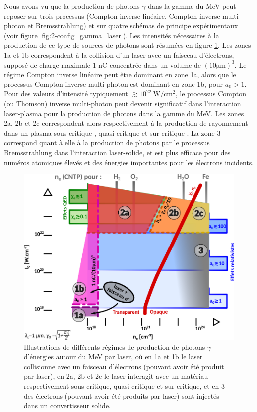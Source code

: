 \begin{refsection}
Nous avons vu que la production de photons $\gamma$ dans la gamme du MeV peut reposer sur trois processus (Compton inverse linéaire, Compton inverse multi-photon et Bremsstrahlung) et sur quatre schémas de principe expérimentaux (voir figure \ref{fig:2-config_gamma_laser}). Les intensités nécessaires à la production de ce type de sources de photons sont résumées en figure \ref{fig:2-regimes_gamma}. Les zones 1a et 1b correspondent à la collision d'un laser avec un faisceau d'électrons, supposé de charge maximale 1 nC concentrée dans un volume de $(10 \si{\um})^3$. Le régime Compton inverse linéaire peut être dominant en zone 1a, alors que le processus Compton inverse multi-photon est dominant en zone 1b, pour $a_0>1$. Pour des valeurs d'intensité typiquement $\gtrsim 10^{22} ~ \si{\W\per\cm^2}$, le processus Compton (ou Thomson) inverse multi-photon peut devenir significatif dans l'interaction laser-plasma pour la production de photons dans la gamme du MeV. Les zones 2a, 2b et 2c correspondent alors respectivement à la production de rayonnement dans un plasma sous-critique \parencite{brady_2012}, quasi-critique \parencite{brady_2013} et sur-critique \parencite{ridgers_2012}. La zone 3 correspond quant à elle à la production de photons par le processus Bremsstrahlung dans l'interaction laser-solide, et est plus efficace pour des numéros atomiques élevés et des énergies importantes pour les électrons incidents.

\begin{figure}[hbtp]
    \centering
    \includegraphics[width=0.8\linewidth]{2-laser/laser_gamma_zones.png}
    \caption{Illustrations de différents régimes de production de photons $\gamma$ d'énergies autour du MeV par laser, où en 1a et 1b le laser collisionne avec un faisceau d'électrons (pouvant avoir été produit par laser), en 2a, 2b et 2c le laser interagit avec un matériau respectivement sous-critique, quasi-critique et sur-critique, et en 3 des électrons (pouvant avoir été produits par laser) sont injectés dans un convertisseur solide.}
    \label{fig:2-regimes_gamma}
\end{figure}

\newpage
\printbibliography[heading=subbibintoc]
\end{refsection}